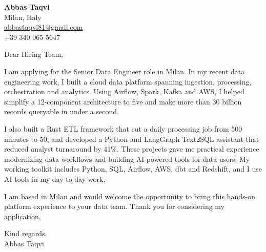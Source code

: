 \documentclass[a4paper,11pt]{article}
\begin{document}
\begin{flushright}
\textbf{Abbas Taqvi}\\
Milan, Italy\\
\href{mailto:abbastaqvi81@gmail.com}{abbastaqvi81@gmail.com}\\
+39 340 065 5647
\end{flushright}

\vspace{8mm}

Dear Hiring Team,

I am applying for the Senior Data Engineer role in Milan. In my recent data engineering work, I built a cloud data platform spanning ingestion, processing, orchestration and analytics. Using Airflow, Spark, Kafka and AWS, I helped simplify a 12-component architecture to five and make more than 30 billion records queryable in under a second.

I also built a Rust ETL framework that cut a daily processing job from 500 minutes to 50, and developed a Python and LangGraph Text2SQL assistant that reduced analyst turnaround by 41\%. These projects gave me practical experience modernizing data workflows and building AI-powered tools for data users. My working toolkit includes Python, SQL, Airflow, AWS, dbt and Redshift, and I use AI tools in my day-to-day work.

I am based in Milan and would welcome the opportunity to bring this hands-on platform experience to your data team. Thank you for considering my application.

Kind regards,\\
Abbas Taqvi
\end{document}
